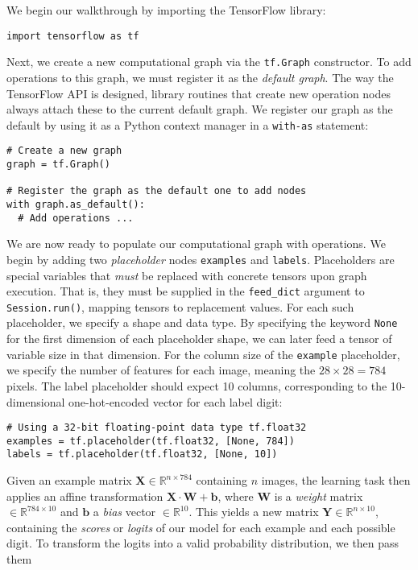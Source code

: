 We begin our walkthrough by importing the TensorFlow library:
%
\begin{lstlisting}
import tensorflow as tf
\end{lstlisting}
%
Next, we create a new computational graph via the \texttt{tf.Graph}
constructor. To add operations to this graph, we must register it as the
\emph{default graph}. The way the TensorFlow API is designed, library routines
that create new operation nodes always attach these to the current default
graph. We register our graph as the default by using it as a Python context
manager in a \texttt{with-as} statement:
%
\begin{lstlisting}
# Create a new graph
graph = tf.Graph()

# Register the graph as the default one to add nodes
with graph.as_default():
  # Add operations ...
\end{lstlisting}
%
We are now ready to populate our computational graph with operations. We begin
by adding two \emph{placeholder} nodes \texttt{examples} and
\texttt{labels}. Placeholders are special variables that \emph{must} be replaced
with concrete tensors upon graph execution. That is, they must be supplied in
the \texttt{feed\_dict} argument to \texttt{Session.run()}, mapping tensors to
replacement values. For each such placeholder, we specify a shape and data
type. By specifying the keyword \texttt{None} for the first dimension of each
placeholder shape, we can later feed a tensor of variable size in that
dimension. For the column size of the \texttt{example} placeholder, we specify
the number of features for each image, meaning the $28 \times 28 = 784$
pixels. The label placeholder should expect 10 columns, corresponding to the
10-dimensional one-hot-encoded vector for each label digit:
%
\begin{lstlisting}
# Using a 32-bit floating-point data type tf.float32
examples = tf.placeholder(tf.float32, [None, 784])
labels = tf.placeholder(tf.float32, [None, 10])
\end{lstlisting}
%
Given an example matrix $\mathbf{X} \in \mathbb{R}^{n \times 784}$ containing
$n$ images, the learning task then applies an affine transformation
$\mathbf{X} \cdot \mathbf{W} + \mathbf{b}$, where $\mathbf{W}$ is a
\emph{weight} matrix $\in \mathbb{R}^{784 \times 10}$ and $\mathbf{b}$ a
\emph{bias} vector $\in \mathbb{R}^{10}$. This yields a new matrix
$\mathbf{Y} \in \mathbb{R}^{n \times 10}$, containing the \emph{scores} or
\emph{logits} of our model for each example and each possible digit. To
transform the logits into a valid probability distribution, we then pass them
